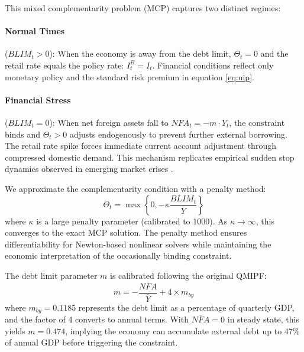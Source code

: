 \documentclass[12pt]{article}
\begin{document}
This mixed complementarity problem (MCP) captures two distinct regimes:

\paragraph{Normal Times} ($BLIM_t > 0$): When the economy is away from the debt limit, $\Theta_t = 0$ and the retail rate equals the policy rate: $I_t^B = I_t$. Financial conditions reflect only monetary policy and the standard risk premium in equation \eqref{eq:uip}.

\paragraph{Financial Stress} ($BLIM_t = 0$): When net foreign assets fall to $NFA_t = -m \cdot Y_t$, the constraint binds and $\Theta_t > 0$ adjusts endogenously to prevent further external borrowing. The retail rate spike forces immediate current account adjustment through compressed domestic demand. This mechanism replicates empirical sudden stop dynamics observed in emerging market crises \citep{calvo2004sudden,lane2012external}.

We approximate the complementarity condition with a penalty method:
\begin{equation}\label{eq:penalty}
\Theta_t = \max\left\{0, -\kappa \frac{BLIM_t}{\overline{Y}}\right\}
\end{equation}
where $\kappa$ is a large penalty parameter (calibrated to 1000). As $\kappa \to \infty$, this converges to the exact MCP solution. The penalty method ensures differentiability for Newton-based nonlinear solvers while maintaining the economic interpretation of the occasionally binding constraint.

The debt limit parameter $m$ is calibrated following the original QMIPF:
\begin{equation}
m = -\frac{\overline{NFA}}{\overline{Y}} + 4 \times m_{by}
\end{equation}
where $m_{by} = 0.1185$ represents the debt limit as a percentage of quarterly GDP, and the factor of 4 converts to annual terms. With $\overline{NFA} = 0$ in steady state, this yields $m = 0.474$, implying the economy can accumulate external debt up to 47\% of annual GDP before triggering the constraint.
\end{document}
